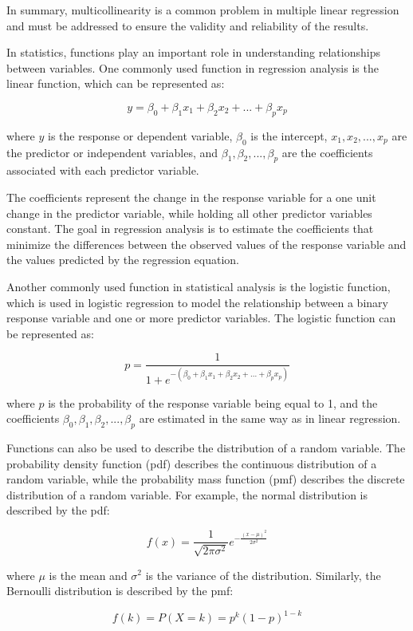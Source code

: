 \documentclass[12pt, a4paper, oneside]{article}
\begin{document}
In summary, multicollinearity is a common problem in multiple linear regression and must be addressed to ensure the validity and reliability of the results.

In statistics, functions play an important role in understanding relationships between variables. One commonly used function in regression analysis is the linear function, which can be represented as:

$$y = \beta_0 + \beta_1x_1 + \beta_2x_2 + ... + \beta_px_p$$

where $y$ is the response or dependent variable, $\beta_0$ is the intercept, $x_1, x_2, ..., x_p$ are the predictor or independent variables, and $\beta_1, \beta_2, ..., \beta_p$ are the coefficients associated with each predictor variable.

The coefficients represent the change in the response variable for a one unit change in the predictor variable, while holding all other predictor variables constant. The goal in regression analysis is to estimate the coefficients that minimize the differences between the observed values of the response variable and the values predicted by the regression equation.

Another commonly used function in statistical analysis is the logistic function, which is used in logistic regression to model the relationship between a binary response variable and one or more predictor variables. The logistic function can be represented as:

$$p = \frac{1}{1 + e^{-(\beta_0 + \beta_1x_1 + \beta_2x_2 + ... + \beta_px_p)}}$$

where $p$ is the probability of the response variable being equal to 1, and the coefficients $\beta_0, \beta_1, \beta_2, ..., \beta_p$ are estimated in the same way as in linear regression.

Functions can also be used to describe the distribution of a random variable. The probability density function (pdf) describes the continuous distribution of a random variable, while the probability mass function (pmf) describes the discrete distribution of a random variable. For example, the normal distribution is described by the pdf:

$$f(x) = \frac{1}{\sqrt{2\pi\sigma^2}}e^{-\frac{(x - \mu)^2}{2\sigma^2}}$$

where $\mu$ is the mean and $\sigma^2$ is the variance of the distribution. Similarly, the Bernoulli distribution is described by the pmf:

$$f(k) = P(X = k) = p^k(1-p)^{1-k}$$
\end{document}
